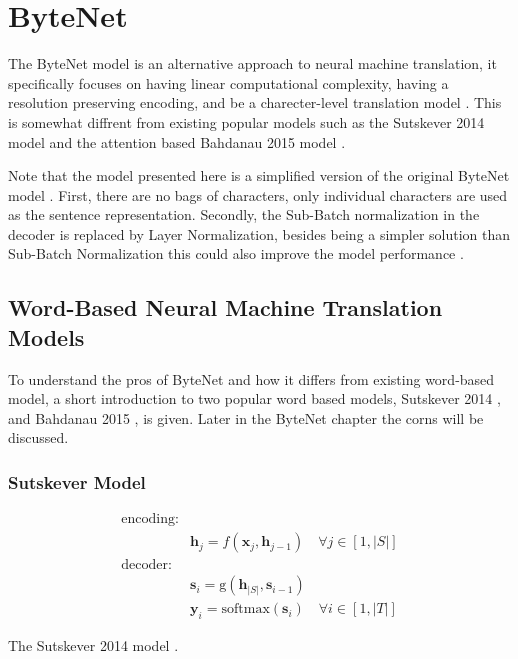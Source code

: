 \section{ByteNet}

The ByteNet model is an alternative approach to neural machine translation, it specifically focuses on having linear computational complexity, having a resolution preserving encoding, and be a charecter-level translation model \cite{bytenet}. This is somewhat diffrent from existing popular models such as the Sutskever 2014 model \cite{sutskever-2014-nmt} and the attention based Bahdanau 2015 model \cite{bahdanau-2015-nmt}.

Note that the model presented here is a simplified version of the original ByteNet model \cite{bytenet}. First, there are no bags of characters, only individual characters are used as the sentence representation. Secondly, the Sub-Batch normalization in the decoder is replaced by Layer Normalization, besides being a simpler solution than Sub-Batch Normalization this could also improve the model performance \cite{layer-normalization}.

\subsection{Word-Based Neural Machine Translation Models}

To understand the pros of ByteNet and how it differs from existing word-based model, a short introduction to two popular word based models, Sutskever 2014 \cite{sutskever-2014-nmt}, and Bahdanau 2015 \cite{bahdanau-2015-nmt}, is given. Later in the ByteNet chapter the corns will be discussed. 

\subsubsection{Sutskever Model}

\begin{equationbox}[H]
\begin{equation*}
\begin{aligned}
\text{encoding:} & \\
& \mathbf{h}_j = f(\mathbf{x}_j, \mathbf{h}_{j-1}) \quad \forall j \in [1, |S|] \\
\text{decoder:} & \\
&\mathbf{s}_i = \mathrm{g}(\mathbf{h}_{|S|}, \mathbf{s}_{i-1}) \\
&\mathbf{y}_i = \mathrm{softmax}(\mathbf{s}_i) \quad \forall i \in [1, |T|] 
\end{aligned}
\end{equation*}
\caption{The Sutskever 2014 model \cite{sutskever-2014-nmt}.}
\end{equationbox}


